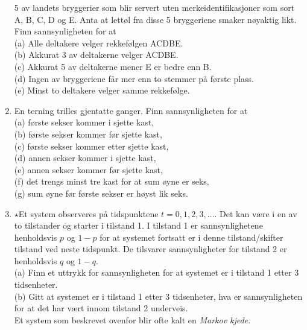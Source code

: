 \begin{enumerate}
     5 av landets bryggerier som blir servert uten
     merkeidentifikasjoner som sort A, B, C, D og E. Anta at
     lettøl fra disse 5 bryggeriene smaker nøyaktig likt. Finn
     sannsynligheten for at\\
     (a)  Alle deltakere velger rekkefølgen ACDBE.\\
     (b)  Akkurat 3 av deltakerne velger ACDBE.\\
     (c)  Akkurat 5 av deltakerne mener E er bedre enn B.\\
     (d)  Ingen av bryggeriene får  mer enn to stemmer på første
          plass.\\
     (e)  Minst to deltakere velger samme rekkefølge.
\item  En terning trilles gjentatte ganger. Finn sannsynligheten
     for at \\
     (a)  første sekser kommer i sjette kast,\\
     (b)  første sekser kommer før sjette kast,\\
     (c)  første sekser kommer etter sjette kast,\\
     (d)  annen sekser kommer i sjette kast,\\
     (e)  annen sekser kommer før sjette kast,\\
     (f)  det trengs minst tre kast for at sum øyne er seks,\\
     (g)  sum øyne før første sekser er høyst lik seks.
\item $\star$Et system observeres på tidspunktene $t = 0, 1, 2, 3, \ldots$.
     Det kan være i en av to tilstander og starter i tilstand 1.
     I tilstand 1 er sannsynlighetene henholdsvis $p$ og $1 - p$
     for at systemet fortsatt er i denne tilstand/skifter
     tilstand ved neste tidspunkt. De tilsvarer sannsynligheter
     for tilstand 2 er henholdsvis $q$ og $1 - q$.\\
     (a)  Finn et uttrykk for sannsynligheten for at systemet er
          i tilstand 1 etter 3 tidsenheter.\\
     (b)  Gitt at systemet er i tilstand 1 etter 3 tidsenheter,  
        hva er sannsynligheten for at det har vært innom     
     tilstand 2 underveis.\\
     Et system som beskrevet ovenfor blir ofte kalt en {\em
     Markov kjede}.
\end{enumerate}
\normalsize

